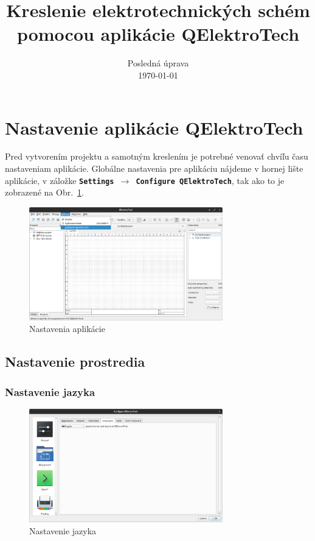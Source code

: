 \documentclass[a4paper,titlepage,11pt]{article}
\title{\textbf{Kreslenie elektrotechnických schém pomocou aplikácie QElektroTech}}
\author{}
\date{Posledná úprava \\ \today}
\begin{document}
\maketitle
\tableofcontents
\newpage

\section{Nastavenie aplikácie QElektroTech}
Pred vytvorením projektu a samotným kreslením je potrebné venovať chvíľu času nastaveniam aplikácie. Globálne nastavenia pre aplikáciu nájdeme v hornej lište aplikácie, v záložke \textbf{\texttt{Settings $\rightarrow$ Configure QElektroTech}}, tak ako to je zobrazené na Obr.~\ref{Fig:nastavenia-aplikacie}.

\begin{figure}[ht]
\centering
\includegraphics[width=0.75\textwidth]{settings-1.png}
\caption{Nastavenia aplikácie}
\label{Fig:nastavenia-aplikacie}
\end{figure}

\subsection{Nastavenie prostredia}



\subsubsection{Nastavenie jazyka}

\begin{figure}[ht]
\centering
\includegraphics[width=0.75\textwidth]{settings-2.png}
\caption{Nastavenie jazyka}
\label{Fig:nastavenie-jazyka}
\end{figure}
\end{document}
